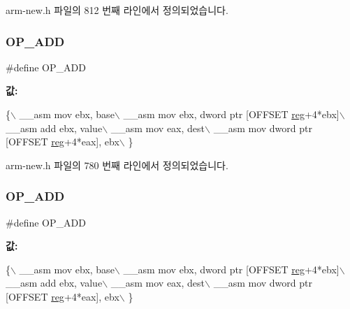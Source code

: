 arm-\/new.\+h 파일의 812 번째 라인에서 정의되었습니다.

\mbox{\label{arm-new_8h_a073d010839a6dc707f3031db67149870}} 
\subsubsection{\texorpdfstring{O\+P\+\_\+\+A\+DD}{OP\_ADD}\hspace{0.1cm}{\footnotesize\ttfamily [1/2]}}
{\footnotesize\ttfamily \#define O\+P\+\_\+\+A\+DD}

{\bfseries 값\+:}
\begin{DoxyCode}
\{\(\backslash\)
        \_\_asm mov ebx, base\(\backslash\)
        \_\_asm mov ebx, dword ptr [OFFSET \mbox{\hyperlink{_g_b_a_8h_ae29faba89509024ffd1a292badcedf2d}{reg}}+4*ebx]\(\backslash\)
        \_\_asm add ebx, value\(\backslash\)
        \_\_asm mov eax, dest\(\backslash\)
        \_\_asm mov dword ptr [OFFSET \mbox{\hyperlink{_g_b_a_8h_ae29faba89509024ffd1a292badcedf2d}{reg}}+4*eax], ebx\(\backslash\)
      \}
\end{DoxyCode}


arm-\/new.\+h 파일의 780 번째 라인에서 정의되었습니다.

\mbox{\label{_g_b_a_8cpp_a073d010839a6dc707f3031db67149870}} 
\subsubsection{\texorpdfstring{O\+P\+\_\+\+A\+DD}{OP\_ADD}\hspace{0.1cm}{\footnotesize\ttfamily [2/2]}}
{\footnotesize\ttfamily \#define O\+P\+\_\+\+A\+DD}

{\bfseries 값\+:}
\begin{DoxyCode}
\{\(\backslash\)
        \_\_asm mov ebx, base\(\backslash\)
        \_\_asm mov ebx, dword ptr [OFFSET \mbox{\hyperlink{_g_b_a_8h_ae29faba89509024ffd1a292badcedf2d}{reg}}+4*ebx]\(\backslash\)
        \_\_asm add ebx, value\(\backslash\)
        \_\_asm mov eax, dest\(\backslash\)
        \_\_asm mov dword ptr [OFFSET \mbox{\hyperlink{_g_b_a_8h_ae29faba89509024ffd1a292badcedf2d}{reg}}+4*eax], ebx\(\backslash\)
      \}
\end{DoxyCode}
\mbox{\label{arm-new_8h_a65004b5c348ae16b8a2b8e0b9f02b9d4}} 
